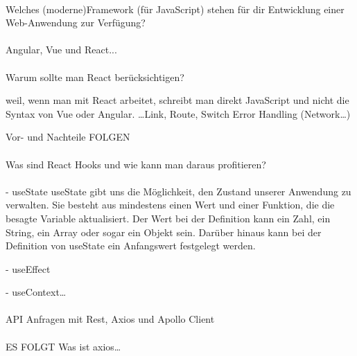 \paragraph{}
Welches (moderne)Framework (für JavaScript) stehen für dir Entwicklung 
einer Web-Anwendung zur Verfügung?


\paragraph{}
Angular, Vue und React...

\paragraph{}
Warum sollte man React berücksichtigen?

weil, wenn man mit React arbeitet, schreibt man direkt JavaScript und nicht die Syntax von Vue oder Angular.
…Link, Route, Switch Error Handling (Network…)

Vor- und Nachteile
FOLGEN

\paragraph{}
Was sind React Hooks und wie kann man daraus profitieren?

\paragraph{}
- useState
useState gibt uns die Möglichkeit, den Zustand unserer Anwendung zu verwalten. Sie besteht aus mindestens einen Wert und einer Funktion, die die besagte Variable aktualisiert.
Der Wert bei der Definition kann ein Zahl, ein String, ein Array oder sogar ein Objekt sein.
Darüber hinaus kann bei der Definition von useState ein Anfangswert festgelegt werden.

- useEffect


- useContext…

\paragraph{}
API Anfragen mit Rest, Axios und Apollo Client 

\paragraph{}
ES FOLGT Was ist axios…

